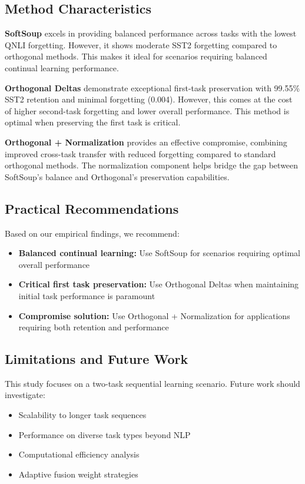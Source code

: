 \documentclass[11pt,a4paper]{article}
\begin{document}
\subsection{Method Characteristics}

\textbf{SoftSoup} excels in providing balanced performance across tasks with the lowest QNLI forgetting. However, it shows moderate SST2 forgetting compared to orthogonal methods. This makes it ideal for scenarios requiring balanced continual learning performance.

\textbf{Orthogonal Deltas} demonstrate exceptional first-task preservation with 99.55\% SST2 retention and minimal forgetting (0.004). However, this comes at the cost of higher second-task forgetting and lower overall performance. This method is optimal when preserving the first task is critical.

\textbf{Orthogonal + Normalization} provides an effective compromise, combining improved cross-task transfer with reduced forgetting compared to standard orthogonal methods. The normalization component helps bridge the gap between SoftSoup's balance and Orthogonal's preservation capabilities.

\subsection{Practical Recommendations}

Based on our empirical findings, we recommend:
\begin{itemize}
    \item \textbf{Balanced continual learning:} Use SoftSoup for scenarios requiring optimal overall performance
    \item \textbf{Critical first task preservation:} Use Orthogonal Deltas when maintaining initial task performance is paramount
    \item \textbf{Compromise solution:} Use Orthogonal + Normalization for applications requiring both retention and performance
\end{itemize}

\subsection{Limitations and Future Work}

This study focuses on a two-task sequential learning scenario. Future work should investigate:
\begin{itemize}
    \item Scalability to longer task sequences
    \item Performance on diverse task types beyond NLP
    \item Computational efficiency analysis
    \item Adaptive fusion weight strategies
\end{itemize}
\end{document}
